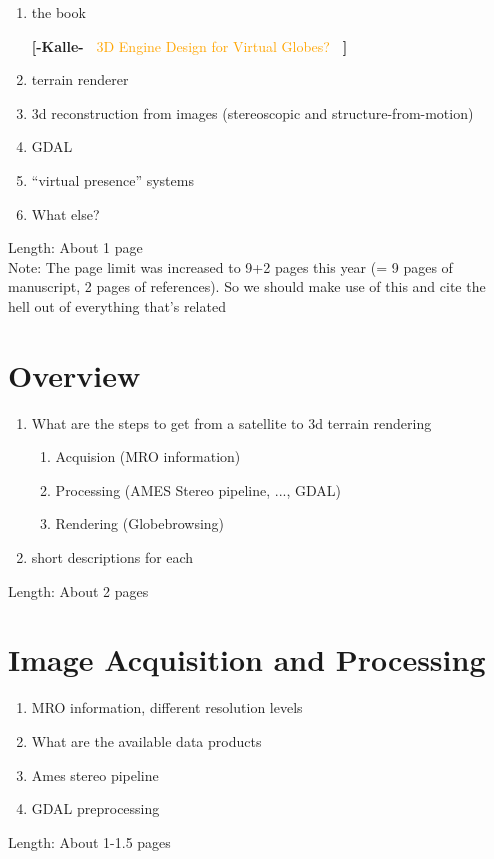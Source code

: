 \documentclass[journal]{vgtc}                %
\newcommand{\kallecomment}[1]{\textbf{[-Kalle-~}
    \textcolor{orange}{#1}
    \textbf{~]}}
\begin{document}
\begin{enumerate}
\item the book

\kallecomment{3D Engine Design for Virtual Globes?}

\item terrain renderer
\item 3d reconstruction from images (stereoscopic and structure-from-motion)
\item GDAL
\item ``virtual presence'' systems
\item What else?
\end{enumerate}
Length: About 1 page\\
Note:  The page limit was increased to 9+2 pages this year (= 9 pages of manuscript, 2 pages of references). So we should make use of this and cite the hell out of everything that's related

\section{Overview} \label{sec:overview}
\begin{enumerate}
  \item What are the steps to get from a satellite to 3d terrain rendering
\begin{enumerate}
  \item Acquision (MRO information)
  \item Processing (AMES Stereo pipeline, ..., GDAL)
  \item Rendering (Globebrowsing)
\end{enumerate}
  \item short descriptions for each
\end{enumerate}
Length: About 2 pages

\section{Image Acquisition and Processing} \label{sec:imageacquisitionprocessing}
\begin{enumerate}
  \item MRO information, different resolution levels
  \item What are the available data products
  \item Ames stereo pipeline
  \item GDAL preprocessing
\end{enumerate}
Length: About 1-1.5 pages
\end{document}
